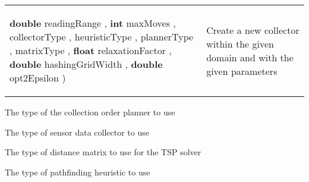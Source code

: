 {\begin{tabularx}{\linewidth}{X|m{}}
\begin{raggedleft}
 \hspace*{ 5pt} \textbf{double} readingRange , \newline
 \hspace*{ 5pt} \textbf{int} maxMoves , \newline
 \hspace*{ 5pt} \textbf{\hyperref[tab:SensorDataCollectorFactory.CollectorType]{\color{blue}{CollectorType}}} collectorType , \newline
 \hspace*{ 5pt} \textbf{\hyperref[tab:SensorDataCollectorFactory.PathfindingHeuristicType]{\color{blue}{PathfindingHeuristicType}}} heuristicType , \newline
 \hspace*{ 5pt} \textbf{\hyperref[tab:SensorDataCollectorFactory.CollectionOrderPlannerType]{\color{blue}{CollectionOrderPlannerType}}} plannerType , \newline
 \hspace*{ 5pt} \textbf{\hyperref[tab:SensorDataCollectorFactory.DistanceMatrixType]{\color{blue}{DistanceMatrixType}}} matrixType , \newline
 \hspace*{ 5pt} \textbf{float} relaxationFactor , \newline
 \hspace*{ 5pt} \textbf{double} hashingGridWidth , \newline
 \hspace*{ 5pt} \textbf{double} opt2Epsilon  )
\end{raggedleft} &
 Create a new collector within the given domain and with the given parameters\\\end{tabularx}
}
 {\scriptsize The type of the collection order planner to use
 
\label{tab:SensorDataCollectorFactory.CollectionOrderPlannerType}
}
 {\scriptsize The type of sensor data collector to use
 
\label{tab:SensorDataCollectorFactory.CollectorType}
}
 {\scriptsize The type of distance matrix to use for the TSP solver
 
\label{tab:SensorDataCollectorFactory.DistanceMatrixType}
}
 {\scriptsize The type of pathfinding heuristic to use
 
\label{tab:SensorDataCollectorFactory.PathfindingHeuristicType}
}
